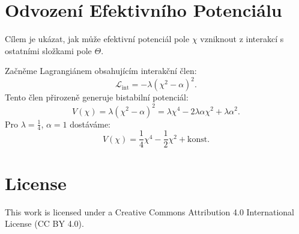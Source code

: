\documentclass{article}
\begin{document}
\section*{Odvození Efektivního Potenciálu}

Cílem je ukázat, jak může efektivní potenciál pole $\chi$ vzniknout z interakcí s ostatními složkami pole $\Theta$.

Začněme Lagrangiánem obsahujícím interakční člen:
\[
\mathcal{L}_{\text{int}} = -\lambda (\chi^2 - \alpha)^2.
\]
Tento člen přirozeně generuje bistabilní potenciál:
\[
V(\chi) = \lambda (\chi^2 - \alpha)^2 = \lambda \chi^4 - 2\lambda \alpha \chi^2 + \lambda \alpha^2.
\]
Pro $\lambda = \frac{1}{4}$, $\alpha = 1$ dostáváme:
\[
V(\chi) = \frac{1}{4} \chi^4 - \frac{1}{2} \chi^2 + \text{konst.}
\]


\section*{License}
This work is licensed under a Creative Commons Attribution 4.0 International License (CC BY 4.0).
\end{document}
